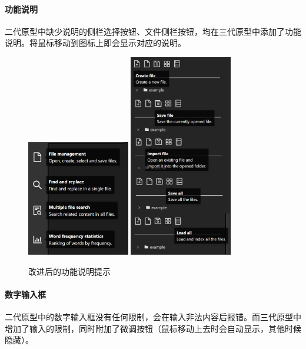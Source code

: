 \documentclass[scheme = chinese]{ctexart}
\begin{document}
\paragraph{功能说明}
二代原型中缺少说明的侧栏选择按钮、文件侧栏按钮，均在三代原型中添加了功能说明。将鼠标移动到图标上即会显示对应的说明。

\begin{figure}[h]
    \centering
    \includegraphics[width=0.4\textwidth]{images/改进-标签提示.png}
    \includegraphics[width=0.4\textwidth]{images/改进-文件按钮提示.png}
    \caption{改进后的功能说明提示}
\end{figure}

\paragraph{数字输入框}
二代原型中的数字输入框没有任何限制，会在输入非法内容后报错。而三代原型中增加了输入的限制，同时附加了微调按钮（鼠标移动上去时会自动显示，其他时候隐藏）。
\end{document}
